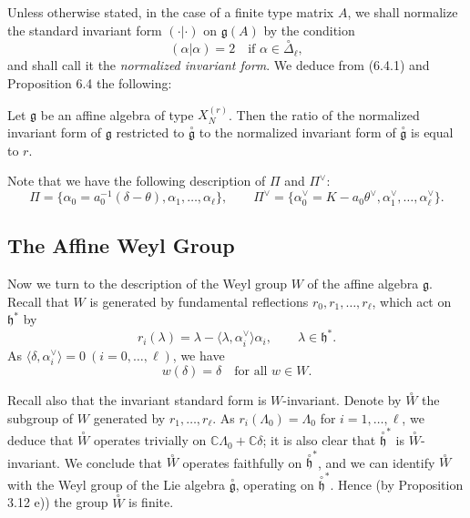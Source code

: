\documentclass[12pt]{article}
\begin{document}
Unless otherwise stated, in the case of a finite type matrix $A$, we shall 
normalize the standard invariant form $(\cdot|\cdot)$ on $\mathfrak{g}(A)$ by the condition
\begin{equation}
(\alpha|\alpha) = 2 \quad \text{if } \alpha \in \overset{\circ}{\Delta}_\ell,
\tag{6.4.2}
\end{equation}
and shall call it the \emph{normalized invariant form}. We deduce from (6.4.1) 
and Proposition 6.4 the following:

\begin{corollary}[6.4]
Let $\mathfrak{g}$ be an affine algebra of type $X_N^{(r)}$. Then the ratio 
of the normalized invariant form of $\mathfrak{g}$ restricted to $\overset{\circ}{\mathfrak{g}}$ 
to the normalized invariant form of $\overset{\circ}{\mathfrak{g}}$ is equal to $r$.
\end{corollary}

Note that we have the following description of $\Pi$ and $\Pi^\vee$:
\[
\Pi = \{\alpha_0 = a_0^{-1}(\delta-\theta), \alpha_1, \dots, \alpha_\ell\},
\qquad
\Pi^\vee = \{\alpha_0^\vee = K - a_0 \theta^\vee, \alpha_1^\vee, \dots, \alpha_\ell^\vee\}.
\]



\subsection{The Affine Weyl Group}
Now we turn to the description of the Weyl group $W$ of the affine 
algebra $\mathfrak{g}$. Recall that $W$ is generated by fundamental reflections 
$r_0, r_1, \dots, r_\ell$, which act on $\mathfrak{h}^*$ by
\[
r_i(\lambda) = \lambda - \langle \lambda, \alpha_i^\vee \rangle \alpha_i,
\qquad \lambda \in \mathfrak{h}^*.
\]
As $\langle \delta, \alpha_i^\vee \rangle = 0 \ (i=0,\dots,\ell)$, we have
\[
w(\delta) = \delta \quad \text{for all } w \in W.
\]

Recall also that the invariant standard form is $W$-invariant.  
Denote by $\overset{\circ}{W}$ the subgroup of $W$ generated by $r_1,\dots,r_\ell$. 
As $r_i(\Lambda_0)=\Lambda_0$ for $i=1,\dots,\ell$, we deduce that $\overset{\circ}{W}$ 
operates trivially on $\mathbb{C}\Lambda_0+\mathbb{C}\delta$; it is also clear 
that $\overset{\circ}{\mathfrak{h}}^*$ is $\overset{\circ}{W}$-invariant. We conclude that 
$\overset{\circ}{W}$ operates faithfully on $\overset{\circ}{\mathfrak{h}}^*$, and we can 
identify $\overset{\circ}{W}$ with the Weyl group of the Lie algebra 
$\overset{\circ}{\mathfrak{g}}$, operating on $\overset{\circ}{\mathfrak{h}}^*$. Hence 
(by Proposition 3.12 e)) the group $\overset{\circ}{W}$ is finite.
\end{document}
